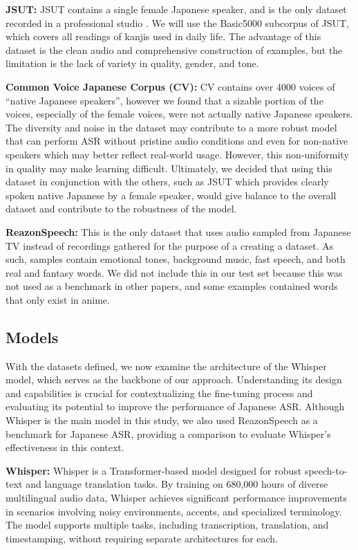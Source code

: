 \documentclass[10pt,twocolumn,letterpaper]{article}
\begin{document}
\textbf{JSUT:}
JSUT contains a single female Japanese speaker, and is the only dataset recorded in a professional studio \cite{sonobeJSUTCorpusFree2017}. We will use the Basic5000 subcorpus of JSUT, which covers all readings of kanjis used in daily life. The advantage of this dataset is the clean audio and comprehensive construction of examples, but the limitation is the lack of variety in quality, gender, and tone. 

\textbf{Common Voice Japanese Corpus (CV):}
CV contains over 4000 voices of “native Japanese speakers”\cite{ardilaCommonVoiceMassivelyMultilingual2020}, however we found that a sizable portion of the voices, especially of the female voices, were not actually native Japanese speakers. The diversity and noise in the dataset may contribute to a more robust model that can perform ASR without pristine audio conditions and even for non-native speakers which may better reflect real-world usage. However, this non-uniformity in quality may make learning difficult. Ultimately, we decided that using this dataset in conjunction with the others, such as JSUT which provides clearly spoken native Japanese by a female speaker, would give balance to the overall dataset and contribute to the robustness of the model.

\textbf{ReazonSpeech:}
This is the only dataset that uses audio sampled from Japanese TV \cite{yinReazonSpeechFreeMassive} instead of recordings gathered for the purpose of a creating a dataset. As such, samples contain emotional tones, background music, fast speech, and both real and fantasy words. We did not include this in our test set because this was not used as a benchmark in other papers, and some examples contained words that only exist in anime.

\subsection{Models}

With the datasets defined, we now examine the architecture of the Whisper model, which serves as the backbone of our approach. Understanding its design and capabilities is crucial for contextualizing the fine-tuning process and evaluating its potential to improve the performance of Japanese ASR. Although Whisper is the main model in this study, we also used ReazonSpeech as a benchmark for Japanese ASR, providing a comparison to evaluate Whisper’s effectiveness in this context.

\textbf{Whisper:}
Whisper is a Transformer-based model designed for robust speech-to-text and language translation tasks\cite{IndroducingWhisper, MediumWhisper}. By training on 680,000 hours of diverse multilingual audio data, Whisper achieves significant performance improvements in scenarios involving noisy environments, accents, and specialized terminology. The model supports multiple tasks, including transcription, translation, and timestamping, without requiring separate architectures for each.
\end{document}
